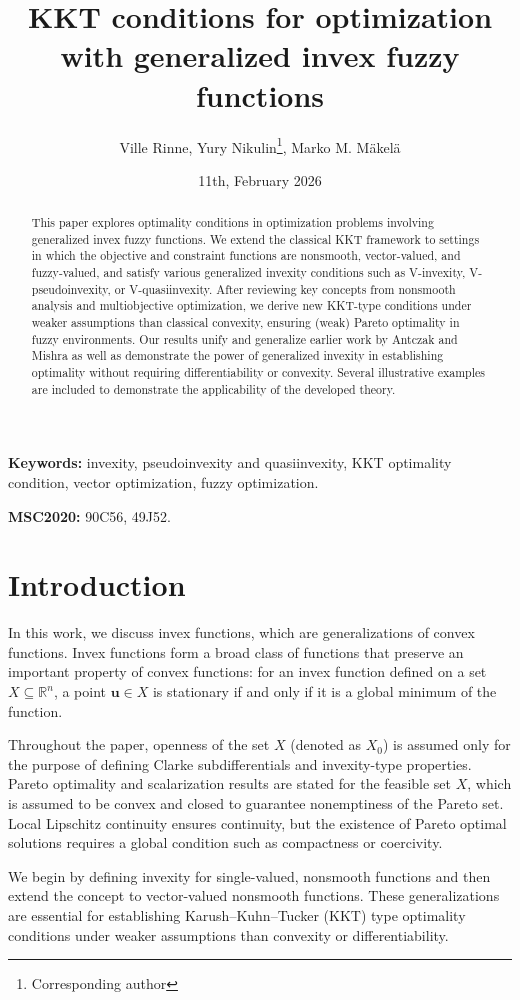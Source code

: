 \documentclass{article}
\title{KKT conditions for optimization with generalized invex fuzzy functions}
\author{Ville Rinne, Yury Nikulin\footnote{Corresponding author}, Marko M. Mäkelä}
\date{11th, February 2026}
\theoremstyle{definition}
\begin{document}
\maketitle
\begin{abstract}
This paper explores optimality conditions in optimization problems involving generalized invex fuzzy functions. We extend the classical KKT framework to settings in which the objective and constraint functions are nonsmooth, vector-valued, and fuzzy-valued, and satisfy various generalized invexity conditions such as V-invexity, V-pseudoinvexity, or V-quasiinvexity. After reviewing key concepts from nonsmooth analysis and multiobjective optimization, we derive new KKT-type conditions under weaker assumptions than classical convexity, ensuring (weak) Pareto optimality in fuzzy environments. Our results unify and generalize earlier work by Antczak and Mishra as well as demonstrate the power of generalized invexity in establishing optimality without requiring differentiability or convexity. Several illustrative examples are included to demonstrate the applicability of the developed theory.
\end{abstract}
{\bf Keywords:} invexity, pseudoinvexity and quasiinvexity, KKT optimality condition, vector optimization, fuzzy optimization.

{\bf MSC2020:} 90C56, 49J52.   

\newpage
\section{Introduction}

In this work, we discuss invex functions, which are generalizations of convex functions. Invex functions form a broad class of functions that preserve an important property of convex functions: for an invex function defined on a set $X \subseteq \mathbb{R}^n$, a point $\boldsymbol{u} \in X$ is stationary if and only if it is a global minimum of the function. 


Throughout the paper, openness of the set $X$ (denoted as $X_0$) is assumed only for the
purpose of defining Clarke subdifferentials and invexity-type properties.
Pareto optimality and scalarization results are stated for the feasible set
$X$, which is assumed to be convex and closed to guarantee nonemptiness of the Pareto set. Local Lipschitz continuity ensures continuity, but the existence of Pareto optimal solutions requires a global condition such as compactness or coercivity.


We begin by defining invexity for single-valued, nonsmooth functions and then extend the concept to vector-valued nonsmooth functions. These generalizations are essential for establishing Karush–Kuhn–Tucker (KKT) type optimality conditions under weaker assumptions than convexity or differentiability.
\end{document}
